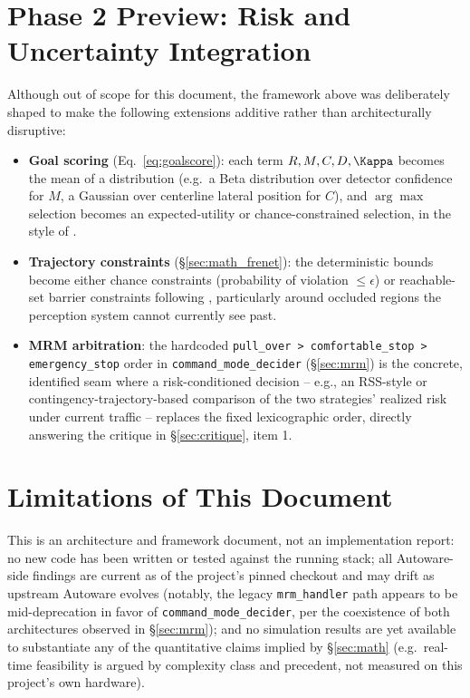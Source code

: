 \documentclass[11pt]{article}
\newcommand{\code}[1]{\texttt{#1}}
\newcommand{\pkg}[1]{\texttt{#1}}
\begin{document}
\section{Phase 2 Preview: Risk and Uncertainty Integration}
\label{sec:phase2}

Although out of scope for this document, the framework above was deliberately shaped to make the
following extensions additive rather than architecturally disruptive:

\begin{itemize}[leftmargin=1.6em]
  \item \textbf{Goal scoring} (Eq.~\ref{eq:goalscore}): each term $R, M, C, D, \Kappa$ becomes the
  mean of a distribution (e.g.\ a Beta distribution over detector confidence for $M$, a Gaussian
  over centerline lateral position for $C$), and $\arg\max$ selection becomes an expected-utility or
  chance-constrained selection, in the style of \cite{lin2025contingency}.
  \item \textbf{Trajectory constraints} (\S\ref{sec:math_frenet}): the deterministic bounds become
  either chance constraints (probability of violation $\leq \epsilon$) or reachable-set barrier
  constraints following \cite{yang2025reachable}, particularly around occluded regions the
  perception system cannot currently see past.
  \item \textbf{MRM arbitration}: the hardcoded \code{pull\_over > comfortable\_stop >
  emergency\_stop} order in \code{command\_mode\_decider} (\S\ref{sec:mrm}) is the concrete,
  identified seam where a risk-conditioned decision -- e.g., an RSS-style
  \cite{shalevshwartz2017rss} or contingency-trajectory-based comparison of the two strategies'
  realized risk under current traffic -- replaces the fixed lexicographic order, directly answering
  the critique in \S\ref{sec:critique}, item 1.
\end{itemize}

\section{Limitations of This Document}
\label{sec:limitations}

This is an architecture and framework document, not an implementation report: no new code has been
written or tested against the running stack; all Autoware-side findings are current as of the
project's pinned checkout and may drift as upstream Autoware evolves (notably, the legacy
\pkg{mrm\_handler} path appears to be mid-deprecation in favor of \pkg{command\_mode\_decider}, per
the coexistence of both architectures observed in \S\ref{sec:mrm}); and no simulation results are
yet available to substantiate any of the quantitative claims implied by \S\ref{sec:math} (e.g.\
real-time feasibility is argued by complexity class and precedent, not measured on this project's
own hardware).
\end{document}
